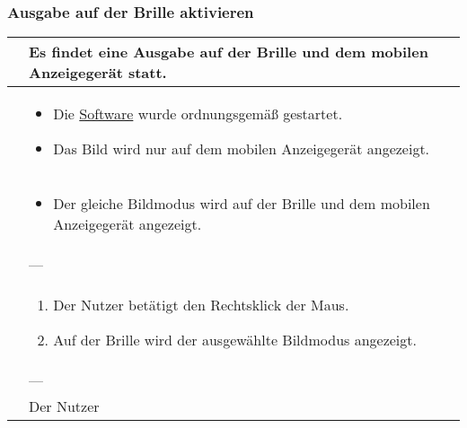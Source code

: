 \subsubsection{Ausgabe auf der Brille aktivieren}
\begin{center}
	\begin{longtable}{| p{3cm} | p{12cm} |}
		\hline
		\goal & Es findet eine Ausgabe auf der Brille und dem mobilen Anzeigegerät statt. \\ \hline
		
		\precondition & \begin{itemize}
			\item Die \hyperlink{tab:anwendung}{Software} wurde ordnungsgemäß gestartet.
			\item Das Bild wird nur auf dem mobilen Anzeigegerät angezeigt.
		\end{itemize} \\ \hline
		
		\postcondition & \begin{itemize}
			\item Der gleiche Bildmodus wird auf der Brille und dem mobilen Anzeigegerät angezeigt.
		\end{itemize} \\ \hline
		
		\postexception & --- \\ \hline
		
		\flow & \begin{enumerate}
			\item Der Nutzer betätigt den Rechtsklick der Maus.
			\item Auf der Brille wird der ausgewählte Bildmodus angezeigt.
		\end{enumerate} \\ \hline
		
		\exception & --- \\ \hline
		
		\player & Der Nutzer \\
		\hline
	\end{longtable}
\end{center}

